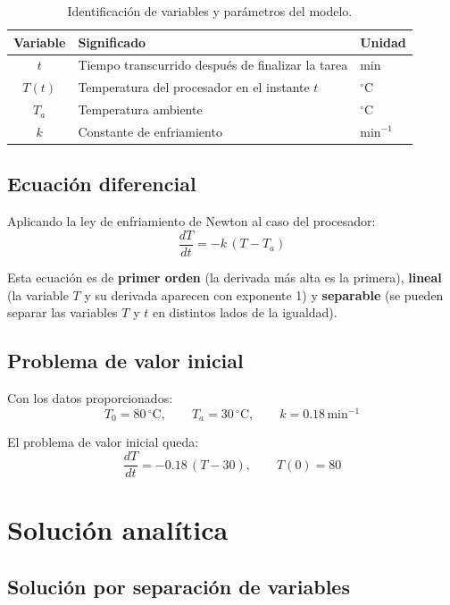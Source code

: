 \documentclass[12pt,a4paper]{article}
\begin{document}
\begin{table}[H]
  \centering
  \begin{tabular}{cll}
    \toprule
    \textbf{Variable} & \textbf{Significado} & \textbf{Unidad} \\
    \midrule
    \(t\)   & Tiempo transcurrido después de finalizar la tarea & min \\
    \(T(t)\) & Temperatura del procesador en el instante \(t\)    & \({}^{\circ}\mathrm{C}\) \\
    \(T_a\)  & Temperatura ambiente                             & \({}^{\circ}\mathrm{C}\) \\
    \(k\)    & Constante de enfriamiento                       & \(\mathrm{min}^{-1}\) \\
    \bottomrule
  \end{tabular}
  \caption{Identificación de variables y parámetros del modelo.}
\end{table}

\subsection{Ecuación diferencial}

Aplicando la ley de enfriamiento de Newton al caso del procesador:
\[
\frac{dT}{dt} = -k\,(T - T_a)
\]

Esta ecuación es de \textbf{primer orden} (la derivada más alta es la primera), \textbf{lineal} (la variable \(T\) y su derivada aparecen con exponente 1) y \textbf{separable} (se pueden separar las variables \(T\) y \(t\) en distintos lados de la igualdad).

\subsection{Problema de valor inicial}

Con los datos proporcionados:
\[
T_0 = 80\,^{\circ}\mathrm{C},\qquad T_a = 30\,^{\circ}\mathrm{C},\qquad k = 0.18\,\mathrm{min}^{-1}
\]

El problema de valor inicial queda:
\[
\boxed{\displaystyle \frac{dT}{dt} = -0.18\,(T - 30)},\qquad \boxed{T(0) = 80}
\]

\section{Solución analítica}

\subsection{Solución por separación de variables}
\end{document}
